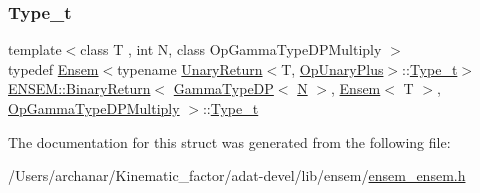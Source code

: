 \subsubsection{\texorpdfstring{Type\_t}{Type\_t}\hspace{0.1cm}{\footnotesize\ttfamily [3/3]}}
{\footnotesize\ttfamily template$<$class T , int N, class Op\+Gamma\+Type\+D\+P\+Multiply $>$ \\
typedef \mbox{\hyperlink{classENSEM_1_1Ensem}{Ensem}}$<$typename \mbox{\hyperlink{structENSEM_1_1UnaryReturn}{Unary\+Return}}$<$T, \mbox{\hyperlink{structENSEM_1_1OpUnaryPlus}{Op\+Unary\+Plus}}$>$\+::\mbox{\hyperlink{structENSEM_1_1BinaryReturn_3_01GammaTypeDP_3_01N_01_4_00_01Ensem_3_01T_01_4_00_01OpGammaTypeDPMultiply_01_4_a73cf3e27d5385f365badeb472933415f}{Type\+\_\+t}}$>$ \mbox{\hyperlink{structENSEM_1_1BinaryReturn}{E\+N\+S\+E\+M\+::\+Binary\+Return}}$<$ \mbox{\hyperlink{classENSEM_1_1GammaTypeDP}{Gamma\+Type\+DP}}$<$ \mbox{\hyperlink{adat__devel_2lib_2hadron_2operator__name__util_8cc_a7722c8ecbb62d99aee7ce68b1752f337}{N}} $>$, \mbox{\hyperlink{classENSEM_1_1Ensem}{Ensem}}$<$ T $>$, \mbox{\hyperlink{structENSEM_1_1OpGammaTypeDPMultiply}{Op\+Gamma\+Type\+D\+P\+Multiply}} $>$\+::\mbox{\hyperlink{structENSEM_1_1BinaryReturn_3_01GammaTypeDP_3_01N_01_4_00_01Ensem_3_01T_01_4_00_01OpGammaTypeDPMultiply_01_4_a73cf3e27d5385f365badeb472933415f}{Type\+\_\+t}}}



The documentation for this struct was generated from the following file\+:\begin{DoxyCompactItemize}
\item 
/\+Users/archanar/\+Kinematic\+\_\+factor/adat-\/devel/lib/ensem/\mbox{\hyperlink{adat-devel_2lib_2ensem_2ensem__ensem_8h}{ensem\+\_\+ensem.\+h}}\end{DoxyCompactItemize}
